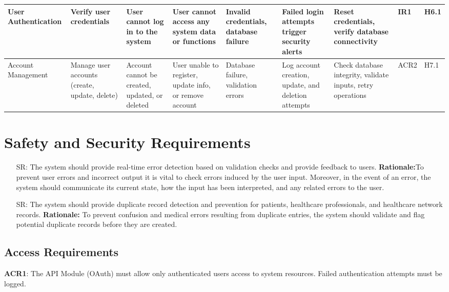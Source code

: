 \documentclass{article}
\newcounter{srnum} %
\begin{document}
\begin{landscape}
\begin{longtable}{|p{1.5cm}|p{2cm}|p{2.6cm}|p{2cm}|p{2cm}|p{2cm}|p{3.5cm}|p{1cm}|p{0.8cm}|}
        \midrule
        User Authentication & \raggedright Verify user credentials & \raggedright User cannot log in to the system & \raggedright User cannot access any system data or functions & \raggedright Invalid credentials, database failure & \raggedright Failed login attempts trigger security alerts & \raggedright Reset credentials, verify database connectivity & IR1 & H6.1 \\
        \midrule
        Account Management & \raggedright Manage user accounts (create, update, delete) & \raggedright Account cannot be created, updated, or deleted & \raggedright User unable to register, update info, or remove account & \raggedright Database failure, validation errors & \raggedright Log account creation, update, and deletion attempts & \raggedright Check database integrity, validate inputs, retry operations & ACR2 & H7.1 \\  
        \bottomrule
    \end{longtable}
\end{landscape}

\section{Safety and Security Requirements}


\begin{itemize}
    \item[SR\refstepcounter{srnum}\thesrnum \label{SR_ErrorDetection}:] The system should provide real-time error detection based on validation checks and provide feedback to users.
    \textbf{Rationale:}To prevent user errors and incorrect output it is vital to check errors induced by the user input. Moreover, in the event of an error, the system should communicate its current state, how the input has been interpreted, and any related errors to the user.
    
    \item [SR\refstepcounter{srnum}\thesrnum \label{SR_DuplicateRecordDetection}:] The system should provide duplicate record detection and prevention for patients, healthcare professionals, and healthcare network records.
    \textbf{Rationale:} To prevent confusion and medical errors resulting from duplicate entries, the system should validate and flag potential duplicate records before they are created.
\end{itemize}

\subsection{Access Requirements}
\textbf{ACR1}: The API Module (OAuth) must allow only authenticated users access to system resources. Failed authentication attempts must be logged.
\end{document}
